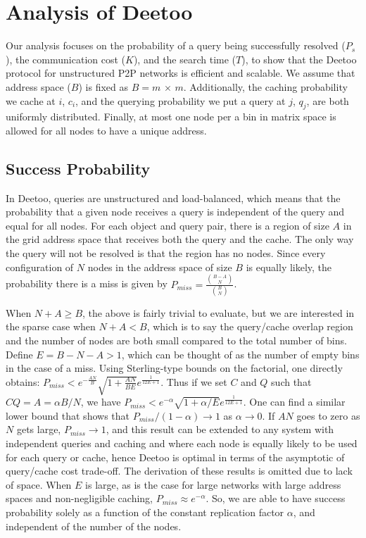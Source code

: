 \documentclass[conference]{IEEEtran}
\begin{document}
\section{Analysis of Deetoo}\label{sec:analysis}
Our analysis focuses on the probability of a query being successfully resolved
($P_{s}$), the communication cost ($K$), and the search time ($T$),
to show that the Deetoo protocol for unstructured P2P
networks is efficient and scalable. We assume that
address space ($B$) is fixed as $B=m$ $\times$
$m$. Additionally, the caching probability we
cache at $i$, $c_{i}$, and the querying
probability we put a query at $j$, $q_{j}$, are both
uniformly distributed. 
Finally, at most one node per
a bin in matrix space is allowed for all nodes to have a unique
address.


\subsection{Success Probability}
\label{sec:suc_prob}
In Deetoo, queries are unstructured and load-balanced, which means
that the probability that a given node receives a query is independent
of the query and equal for all nodes.
For each object and query pair, there
is a region of size $A$ in the grid address space that receives both the query
and the cache. The only way the query will not be resolved is that the region
has no nodes.  Since every configuration of $N$ nodes in the address
space of size $B$ is equally likely, the probability there is a miss is given
by $P_{miss}=\frac{{{B-A}\choose N }}{{B \choose N}}$.

When $N+A\ge B$, the above is fairly trivial to evaluate, but we are
interested in the sparse case when $N+A<B$, which is to say the query/cache
overlap region and the number of nodes are both small compared to the total
number of bins.  Define $E=B-N-A>1$, which can be thought of as the number of
empty bins in the case of a miss.
Using Sterling-type bounds on the factorial, one directly obtains:
$P_{miss} < e^{-\frac{AN}{B}}\sqrt{1+\frac{AN}{BE}}e^{\frac{1}{12E+1}}$.
Thus if we set $C$ and $Q$ such that
$CQ=A=\alpha B/N$, we have
$P_{miss} < e^{-\alpha}\sqrt{1+\alpha/E}e^{\frac{1}{12E+1}}$.
One can find a similar lower bound that shows that
$P_{miss}/(1-\alpha)\rightarrow 1$ as $\alpha\rightarrow 0$.
If $AN$ goes to zero as $N$ gets large, $P_{miss}\rightarrow 1$,
and this result can be extended to any system with independent queries and
caching and where each node is equally likely to be used for each query or
cache, hence Deetoo is optimal in terms of the asymptotic of query/cache cost
trade-off.
The derivation of these results is omitted due to
lack of space.
When $E$ is large, as is the case for large networks with large address
spaces and non-negligible caching, $P_{miss}\approx e^{-\alpha}$.
So, we are able to have success probability solely as a function of the 
constant replication factor $\alpha$, and 
independent of the number of the nodes.
\end{document}
